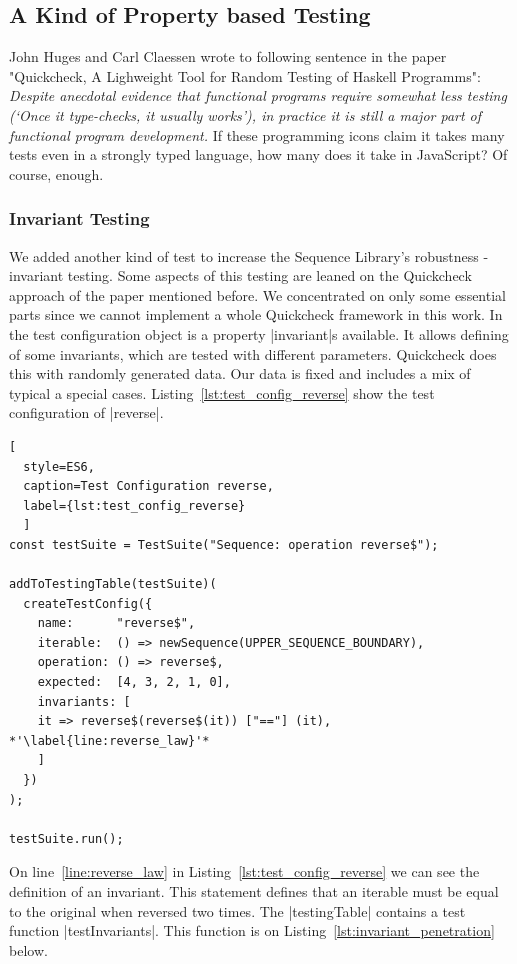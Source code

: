 \subsection{A Kind of Property based Testing}
John Huges and Carl Claessen wrote to following sentence in the paper
"Quickcheck, A Lighweight Tool for Random Testing of Haskell Programms":
\textit{
Despite anecdotal evidence that functional programs require somewhat less
testing (`Once it type-checks, it usually works'), in practice it is still a 
major part of functional program development.}
If these programming icons claim it takes many tests even in a strongly typed 
language, how many does it take in JavaScript? Of course, enough.

\subsubsection{Invariant Testing}
\label{subsub:Invariant Testing}
We added another kind of test to increase the Sequence Library's robustness -
invariant testing. Some aspects of this testing are leaned on the Quickcheck
approach of the paper mentioned before. We concentrated on only some essential
parts since we cannot implement a whole Quickcheck framework in this work.
\newline
In the test configuration object
is a property |invariant|s available. It allows defining of some invariants, which are
tested with different parameters. Quickcheck does this with randomly generated
data. Our data is fixed and includes a mix of typical a special cases.
\newline
Listing~\ref{lst:test_config_reverse} show the test configuration of |reverse|.

\begin{lstlisting}[
  style=ES6, 
  caption=Test Configuration reverse,
  label={lst:test_config_reverse}
  ]
const testSuite = TestSuite("Sequence: operation reverse$");

addToTestingTable(testSuite)(
  createTestConfig({
    name:      "reverse$",
    iterable:  () => newSequence(UPPER_SEQUENCE_BOUNDARY),
    operation: () => reverse$,
    expected:  [4, 3, 2, 1, 0],
    invariants: [
    it => reverse$(reverse$(it)) ["=="] (it), *'\label{line:reverse_law}'*
    ]
  })
);

testSuite.run();
\end{lstlisting}
On line~\ref{line:reverse_law} in Listing~\ref{lst:test_config_reverse} we can 
see the definition of an invariant. This statement defines that an iterable must be 
equal to the original when reversed two times.
\newline
The |testingTable| contains a test function |testInvariants|. This function is on
Listing~\ref{lst:invariant_penetration} below.

